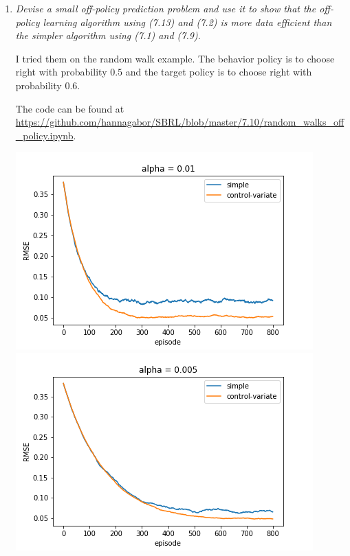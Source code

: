 \documentclass[12pt,a4paper]{article}
\begin{document}
\begin{enumerate}
  \item
    \textit{Devise a small off-policy prediction problem and use it to show that
    the off-policy learning algorithm using (7.13) and (7.2) is more data efficient
    than the simpler algorithm using (7.1) and (7.9).}

    I tried them on the random walk example. The behavior policy is to choose right
    with probability $0.5$ and the target policy is to choose right with probability
    $0.6$.

    The code can be found at \url{https://github.com/hannagabor/SBRL/blob/master/7.10/random_walks_off_policy.ipynb}.

    \begin{center}
    \includegraphics[scale=0.45]{off_0.01}
    \includegraphics[scale=0.45]{off_0.005}
    \end{center}

\end{enumerate}
\end{document}
